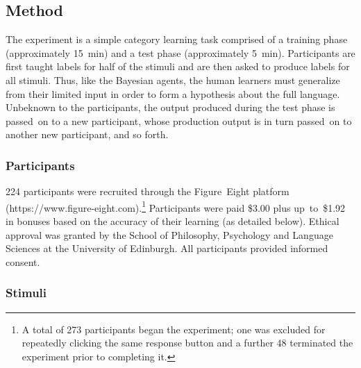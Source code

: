 \documentclass[doc,biblatex]{apa7}
\begin{document}
\subsection{Method}

The experiment is a simple category learning task comprised of a training phase (approximately 15~min) and a test phase (approximately 5~min). Participants are first taught labels for half of the stimuli and are then asked to produce labels for all stimuli. Thus, like the Bayesian agents, the human learners must generalize from their limited input in order to form a hypothesis about the full language. Unbeknown to the participants, the output produced during the test phase is passed~on to a new participant, whose production output is in turn passed~on to another new participant, and so forth.

\subsubsection{Participants}

224 participants were recruited through the Figure~Eight platform (https://www.figure-eight.com).\footnote{A total of 273 participants began the experiment; one was excluded for repeatedly clicking the same response button and a further 48 terminated the experiment prior to completing it.} Participants were paid \$3.00 plus up~to~\$1.92 in bonuses based on the accuracy of their learning (as detailed below). Ethical approval was granted by the School of Philosophy, Psychology and Language Sciences at the University of Edinburgh. All participants provided informed consent.

\subsubsection{Stimuli}
\end{document}
